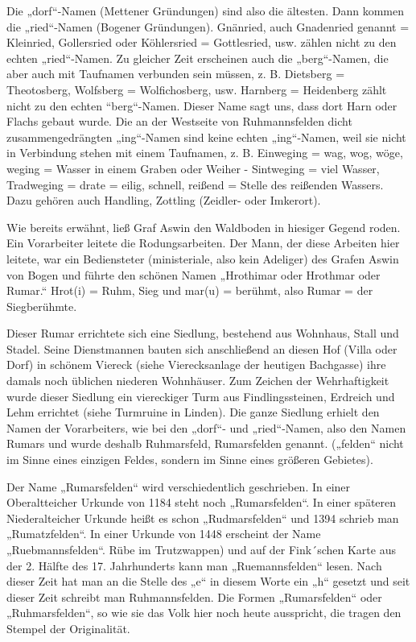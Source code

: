 \documentclass[12pt,a4paper]{book}
\begin{document}
Die „dorf“-Namen (Mettener Gründungen) sind also die ältesten. Dann
kommen die „ried“-Namen (Bogener Gründungen). Gnänried, auch Gnadenried
genannt = Kleinried, Gollersried oder Köhlersried = Gottlesried, usw.
zählen nicht zu den echten „ried“-Namen. Zu gleicher Zeit erscheinen
auch die „berg“-Namen, die aber auch mit Taufnamen verbunden sein
müssen, z. B. Dietsberg = Theotosberg, Wolfsberg = Wolfichosberg, usw.
Harnberg = Heidenberg zählt nicht zu den echten “berg“-Namen. Dieser
Name sagt uns, dass dort Harn oder Flachs gebaut wurde. Die an der
Westseite von Ruhmannsfelden dicht zusammengedrängten „ing“-Namen sind
keine echten „ing“-Namen, weil sie nicht in Verbindung stehen mit einem
Taufnamen, z. B. Einweging = wag, wog, wöge, weging = Wasser in einem
Graben oder Weiher - Sintweging = viel Wasser, Tradweging = drate =
eilig, schnell, reißend = Stelle des reißenden Wassers. Dazu gehören
auch Handling, Zottling (Zeidler- oder Imkerort).

Wie bereits erwähnt, ließ Graf Aswin den Waldboden in hiesiger Gegend
roden. Ein Vorarbeiter leitete die Rodungsarbeiten. Der Mann, der diese
Arbeiten hier leitete, war ein Bediensteter (ministeriale, also kein
Adeliger) des Grafen Aswin von Bogen und führte den schönen Namen
„Hrothimar oder Hrothmar oder Rumar.“ Hrot(i) = Ruhm, Sieg und mar(u) =
berühmt, also Rumar = der Siegberühmte.

Dieser Rumar errichtete sich eine Siedlung, bestehend aus Wohnhaus,
Stall und Stadel. Seine Dienstmannen bauten sich anschließend an diesen
Hof (Villa oder Dorf) in schönem Viereck (siehe Vierecksanlage der
heutigen Bachgasse) ihre damals noch üblichen niederen Wohnhäuser. Zum
Zeichen der Wehrhaftigkeit wurde dieser Siedlung ein viereckiger Turm
aus Findlingssteinen, Erdreich und Lehm errichtet (siehe Turmruine in
Linden). Die ganze Siedlung erhielt den Namen der Vorarbeiters, wie bei
den „dorf“- und „ried“-Namen, also den Namen Rumars und wurde deshalb
Ruhmarsfeld, Rumarsfelden genannt. („felden“ nicht im Sinne eines
einzigen Feldes, sondern im Sinne eines größeren Gebietes).

Der Name „Rumarsfelden“ wird verschiedentlich geschrieben. In einer
Oberaltteicher Urkunde von 1184 steht noch „Rumarsfelden“. In einer
späteren Niederalteicher Urkunde heißt es schon „Rudmarsfelden“ und 1394
schrieb man „Rumatzfelden“. In einer Urkunde von 1448 erscheint der Name
„Ruebmannsfelden“. Rübe im Trutzwappen) und auf der Fink´schen Karte aus
der 2. Hälfte des 17. Jahrhunderts kann man „Ruemannsfelden“ lesen. Nach
dieser Zeit hat man an die Stelle des „e“ in diesem Worte ein „h“
gesetzt und seit dieser Zeit schreibt man Ruhmannsfelden. Die Formen
„Rumarsfelden“ oder „Ruhmarsfelden“, so wie sie das Volk hier noch heute
ausspricht, die tragen den Stempel der Originalität.
\end{document}
